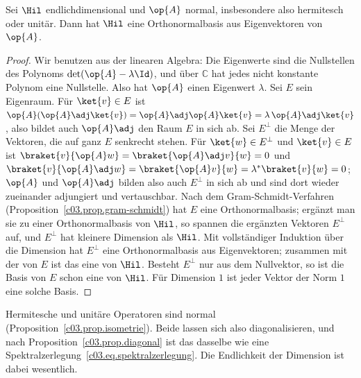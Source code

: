 \begin{theorem}\label{c03.thm.spektral}
  Sei $\Hil$ endlichdimensional und $\op{A}$ normal, insbesondere also hermitesch oder unitär.
  Dann hat $\Hil$ eine Orthonormalbasis aus Eigenvektoren von $\op{A}$.
\end{theorem}
\begin{proof}
  Wir benutzen aus der linearen Algebra: Die Eigenwerte sind die Nullstellen des Polynoms
  $\det(\op{A} - \lambda\Id)$, und über $\mathbb{C}$ hat jedes nicht konstante Polynom eine
  Nullstelle. Also hat $\op{A}$ einen Eigenwert $\lambda$. Sei $E$ sein Eigenraum. Für
  $\ket{v} \in E$ ist $\op{A}(\op{A}\adj\ket{v}) = \op{A}\adj\op{A}\ket{v} = \lambda\,\op{A}\adj\ket{v}$,
  also bildet auch $\op{A}\adj$ den Raum $E$ in sich ab. Sei $E^\perp$ die Menge der Vektoren,
  die auf ganz $E$ senkrecht stehen. Für $\ket{w} \in E^\perp$ und $\ket{v} \in E$ ist
  $\braket{v}{\op{A}w} = \braket{\op{A}\adj v}{w} = 0$ und
  $\braket{v}{\op{A}\adj w} = \braket{\op{A}v}{w} = \lambda^*\braket{v}{w} = 0$; $\op{A}$ und
  $\op{A}\adj$ bilden also auch $E^\perp$ in sich ab und sind dort wieder zueinander adjungiert
  und vertauschbar. Nach dem Gram-Schmidt-Verfahren (Proposition~\ref{c03.prop.gram-schmidt}) hat
  $E$ eine Orthonormalbasis; ergänzt man sie zu einer Orthonormalbasis von $\Hil$, so spannen die
  ergänzten Vektoren $E^\perp$ auf, und $E^\perp$ hat kleinere Dimension als $\Hil$. Mit
  vollständiger Induktion über die Dimension hat $E^\perp$ eine Orthonormalbasis aus
  Eigenvektoren; zusammen mit der von $E$ ist das eine von $\Hil$. Besteht $E^\perp$ nur aus dem
  Nullvektor, so ist die Basis von $E$ schon eine von $\Hil$. Für Dimension $1$ ist jeder Vektor
  der Norm $1$ eine solche Basis.
\end{proof}

Hermitesche und unitäre Operatoren sind normal (Proposition~\ref{c03.prop.isometrie}). Beide lassen
sich also diagonalisieren, und nach Proposition~\ref{c03.prop.diagonal} ist das dasselbe wie eine
Spektralzerlegung~\eqref{c03.eq.spektralzerlegung}. Die Endlichkeit der Dimension ist dabei
wesentlich.

